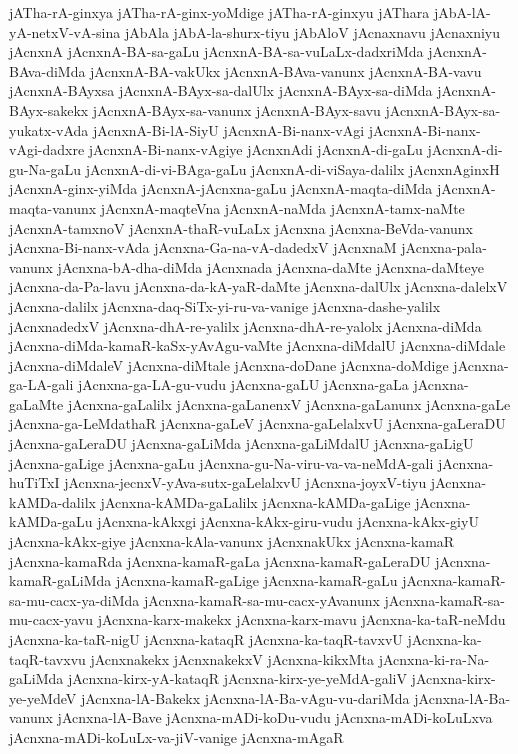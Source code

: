 {jATha-rA-ginxya
jATha-rA-ginx-yoMdige
jATha-rA-ginxyu
jAThara
jAbA-lA-yA-netxV-vA-sina
jAbAla
jAbA-la-shurx-tiyu
jAbAloV
jAcnaxnavu
jAcnaxniyu
jAcnxnA
jAcnxnA-BA-sa-gaLu
jAcnxnA-BA-sa-vuLaLx-dadxriMda
jAcnxnA-BAva-diMda
jAcnxnA-BA-vakUkx
jAcnxnA-BAva-vanunx
jAcnxnA-BA-vavu
jAcnxnA-BAyxsa
jAcnxnA-BAyx-sa-dalUlx
jAcnxnA-BAyx-sa-diMda
jAcnxnA-BAyx-sakekx
jAcnxnA-BAyx-sa-vanunx
jAcnxnA-BAyx-savu
jAcnxnA-BAyx-sa-yukatx-vAda
jAcnxnA-Bi-lA-SiyU
jAcnxnA-Bi-nanx-vAgi
jAcnxnA-Bi-nanx-vAgi-dadxre
jAcnxnA-Bi-nanx-vAgiye
jAcnxnAdi
jAcnxnA-di-gaLu
jAcnxnA-di-gu-Na-gaLu
jAcnxnA-di-vi-BAga-gaLu
jAcnxnA-di-viSaya-dalilx
jAcnxnAginxH
jAcnxnA-ginx-yiMda
jAcnxnA-jAcnxna-gaLu
jAcnxnA-maqta-diMda
jAcnxnA-maqta-vanunx
jAcnxnA-maqteVna
jAcnxnA-naMda
jAcnxnA-tamx-naMte
jAcnxnA-tamxnoV
jAcnxnA-thaR-vuLaLx
jAcnxna
jAcnxna-BeVda-vanunx
jAcnxna-Bi-nanx-vAda
jAcnxna-Ga-na-vA-dadedxV
jAcnxnaM
jAcnxna-pala-vanunx
jAcnxna-bA-dha-diMda
jAcnxnada
jAcnxna-daMte
jAcnxna-daMteye
jAcnxna-da-Pa-lavu
jAcnxna-da-kA-yaR-daMte
jAcnxna-dalUlx
jAcnxna-dalelxV
jAcnxna-dalilx
jAcnxna-daq-SiTx-yi-ru-va-vanige
jAcnxna-dashe-yalilx
jAcnxnadedxV
jAcnxna-dhA-re-yalilx
jAcnxna-dhA-re-yalolx
jAcnxna-diMda
jAcnxna-diMda-kamaR-kaSx-yAvAgu-vaMte
jAcnxna-diMdalU
jAcnxna-diMdale
jAcnxna-diMdaleV
jAcnxna-diMtale
jAcnxna-doDane
jAcnxna-doMdige
jAcnxna-ga-LA-gali
jAcnxna-ga-LA-gu-vudu
jAcnxna-gaLU
jAcnxna-gaLa
jAcnxna-gaLaMte
jAcnxna-gaLalilx
jAcnxna-gaLanenxV
jAcnxna-gaLanunx
jAcnxna-gaLe
jAcnxna-ga-LeMdathaR
jAcnxna-gaLeV
jAcnxna-gaLelalxvU
jAcnxna-gaLeraDU
jAcnxna-gaLeraDU
jAcnxna-gaLiMda
jAcnxna-gaLiMdalU
jAcnxna-gaLigU
jAcnxna-gaLige
jAcnxna-gaLu
jAcnxna-gu-Na-viru-va-va-neMdA-gali
jAcnxna-huTiTxI
jAcnxna-jecnxV-yAva-sutx-gaLelalxvU
jAcnxna-joyxV-tiyu
jAcnxna-kAMDa-dalilx
jAcnxna-kAMDa-gaLalilx
jAcnxna-kAMDa-gaLige
jAcnxna-kAMDa-gaLu
jAcnxna-kAkxgi
jAcnxna-kAkx-giru-vudu
jAcnxna-kAkx-giyU
jAcnxna-kAkx-giye
jAcnxna-kAla-vanunx
jAcnxnakUkx
jAcnxna-kamaR
jAcnxna-kamaRda
jAcnxna-kamaR-gaLa
jAcnxna-kamaR-gaLeraDU
jAcnxna-kamaR-gaLiMda
jAcnxna-kamaR-gaLige
jAcnxna-kamaR-gaLu
jAcnxna-kamaR-sa-mu-cacx-ya-diMda
jAcnxna-kamaR-sa-mu-cacx-yAvanunx
jAcnxna-kamaR-sa-mu-cacx-yavu
jAcnxna-karx-makekx
jAcnxna-karx-mavu
jAcnxna-ka-taR-neMdu
jAcnxna-ka-taR-nigU
jAcnxna-kataqR
jAcnxna-ka-taqR-tavxvU
jAcnxna-ka-taqR-tavxvu
jAcnxnakekx
jAcnxnakekxV
jAcnxna-kikxMta
jAcnxna-ki-ra-Na-gaLiMda
jAcnxna-kirx-yA-kataqR
jAcnxna-kirx-ye-yeMdA-galiV
jAcnxna-kirx-ye-yeMdeV
jAcnxna-lA-Bakekx
jAcnxna-lA-Ba-vAgu-vu-dariMda
jAcnxna-lA-Ba-vanunx
jAcnxna-lA-Bave
jAcnxna-mADi-koDu-vudu
jAcnxna-mADi-koLuLxva
jAcnxna-mADi-koLuLx-va-jiV-vanige
jAcnxna-mAgaR
}
